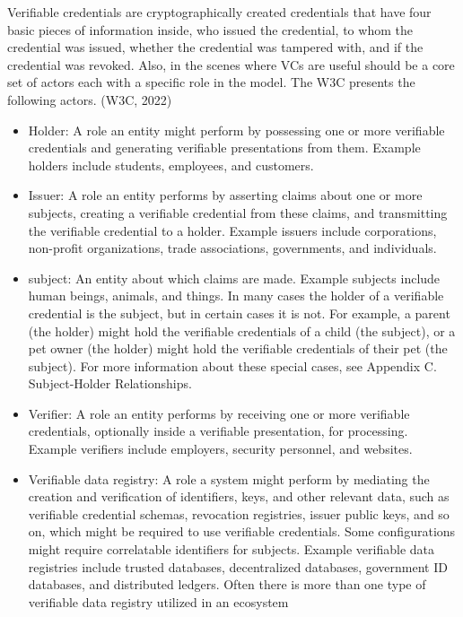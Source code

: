 Verifiable credentials are cryptographically created credentials that have four basic pieces of information inside, who issued the credential, to whom the credential was issued, whether the credential was tampered with, and if the credential was revoked. Also, in the scenes where VCs are useful should be a core set of actors each with a specific role in the model. The W3C presents the following actors. (W3C, 2022)

\begin{itemize}
    \item Holder: A role an entity might perform by possessing one or more verifiable credentials and generating verifiable presentations from them. Example holders include students, employees, and customers.
    \item Issuer: A role an entity performs by asserting claims about one or more subjects, creating a verifiable credential from these claims, and transmitting the verifiable credential to a holder. Example issuers include corporations, non-profit organizations, trade associations, governments, and individuals.
    \item subject: An entity about which claims are made. Example subjects include human beings, animals, and things. In many cases the holder of a verifiable credential is the subject, but in certain cases it is not. For example, a parent (the holder) might hold the verifiable credentials of a child (the subject), or a pet owner (the holder) might hold the verifiable credentials of their pet (the subject). For more information about these special cases, see Appendix C. Subject-Holder Relationships.
    \item Verifier: A role an entity performs by receiving one or more verifiable credentials, optionally inside a verifiable presentation, for processing. Example verifiers include employers, security personnel, and websites.
    \item Verifiable data registry: A role a system might perform by mediating the creation and verification of identifiers, keys, and other relevant data, such as verifiable credential schemas, revocation registries, issuer public keys, and so on, which might be required to use verifiable credentials. Some configurations might require correlatable identifiers for subjects. Example verifiable data registries include trusted databases, decentralized databases, government ID databases, and distributed ledgers. Often there is more than one type of verifiable data registry utilized in an ecosystem
\end{itemize}

